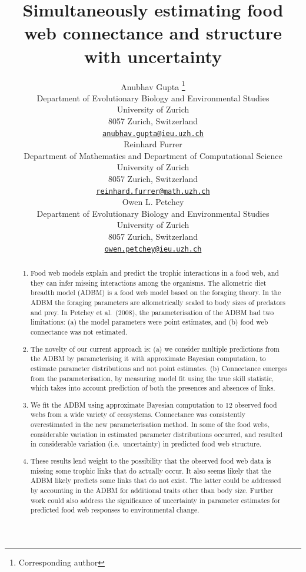 \documentclass{article}
\title{Simultaneously estimating food web connectance and structure with
uncertainty}
\author{
    Anubhav Gupta
    \thanks{Corresponding author}
   \\
    Department of Evolutionary Biology and Environmental Studies \\
    University of Zurich \\
  8057 Zurich, Switzerland \\
  \texttt{\href{mailto:anubhav.gupta@ieu.uzh.ch}{\nolinkurl{anubhav.gupta@ieu.uzh.ch}}} \\
   \And
    Reinhard Furrer
   \\
    Department of Mathematics and Department of Computational Science \\
    University of Zurich \\
  8057 Zurich, Switzerland \\
  \texttt{\href{mailto:reinhard.furrer@math.uzh.ch}{\nolinkurl{reinhard.furrer@math.uzh.ch}}} \\
   \And
    Owen L. Petchey
   \\
    Department of Evolutionary Biology and Environmental Studies \\
    University of Zurich \\
  8057 Zurich, Switzerland \\
  \texttt{\href{mailto:owen.petchey@ieu.uzh.ch}{\nolinkurl{owen.petchey@ieu.uzh.ch}}} \\
  }
\begin{document}
\maketitle

\def\tightlist{}


\begin{abstract}
\begin{enumerate}
\def\labelenumi{\arabic{enumi})}
\tightlist
\item
  Food web models explain and predict the trophic interactions in a food
  web, and they can infer missing interactions among the organisms. The
  allometric diet breadth model (ADBM) is a food web model based on the
  foraging theory. In the ADBM the foraging parameters are
  allometrically scaled to body sizes of predators and prey. In Petchey
  et al.~(2008), the parameterisation of the ADBM had two limitations:
  (a) the model parameters were point estimates, and (b) food web
  connectance was not estimated.
\item
  The novelty of our current approach is: (a) we consider multiple
  predictions from the ADBM by parameterising it with approximate
  Bayesian computation, to estimate parameter distributions and not
  point estimates. (b) Connectance emerges from the parameterisation, by
  measuring model fit using the true skill statistic, which takes into
  account prediction of both the presences and absences of links.
\item
  We fit the ADBM using approximate Bayesian computation to 12 observed
  food webs from a wide variety of ecosystems. Connectance was
  consistently overestimated in the new parameterisation method. In some
  of the food webs, considerable variation in estimated parameter
  distributions occurred, and resulted in considerable variation
  (i.e.~uncertainty) in predicted food web structure.
\item
  These results lend weight to the possibility that the observed food
  web data is missing some trophic links that do actually occur. It also
  seems likely that the ADBM likely predicts some links that do not
  exist. The latter could be addressed by accounting in the ADBM for
  additional traits other than body size. Further work could also
  address the significance of uncertainty in parameter estimates for
  predicted food web responses to environmental change.
\end{enumerate}
\end{abstract}

\end{document}
